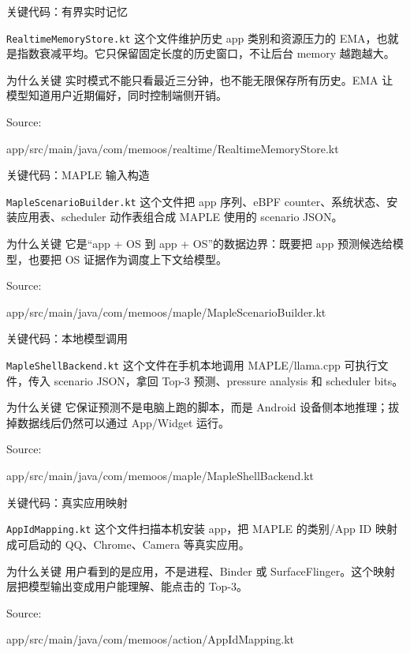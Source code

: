 \documentclass[UTF8,aspectratio=169,10pt]{ctexbeamer}
\newcommand{\code}[1]{\texttt{\small #1}}
\newcommand{\sourcefoot}[1]{%
  \vfill
  {\scriptsize\textcolor{memoGray}{Source: }%
  \parbox[t]{0.84\textwidth}{\raggedright\ttfamily\scriptsize #1}}%
}
\begin{document}
\begin{frame}{关键代码：有界实时记忆}
  \begin{block}{\code{RealtimeMemoryStore.kt}}
    这个文件维护历史 app 类别和资源压力的 EMA，也就是指数衰减平均。它只保留固定长度的历史窗口，不让后台 memory 越跑越大。
  \end{block}
  \begin{block}{为什么关键}
    实时模式不能只看最近三分钟，也不能无限保存所有历史。EMA 让模型知道用户近期偏好，同时控制端侧开销。
  \end{block}
  \sourcefoot{app/src/main/java/com/memoos/realtime/RealtimeMemoryStore.kt}
\end{frame}

\begin{frame}{关键代码：MAPLE 输入构造}
  \begin{block}{\code{MapleScenarioBuilder.kt}}
    这个文件把 app 序列、eBPF counter、系统状态、安装应用表、scheduler 动作表组合成 MAPLE 使用的 scenario JSON。
  \end{block}
  \begin{block}{为什么关键}
    它是“app + OS 到 app + OS”的数据边界：既要把 app 预测候选给模型，也要把 OS 证据作为调度上下文给模型。
  \end{block}
  \sourcefoot{app/src/main/java/com/memoos/maple/MapleScenarioBuilder.kt}
\end{frame}

\begin{frame}{关键代码：本地模型调用}
  \begin{block}{\code{MapleShellBackend.kt}}
    这个文件在手机本地调用 MAPLE/llama.cpp 可执行文件，传入 scenario JSON，拿回 Top-3 预测、pressure analysis 和 scheduler bits。
  \end{block}
  \begin{block}{为什么关键}
    它保证预测不是电脑上跑的脚本，而是 Android 设备侧本地推理；拔掉数据线后仍然可以通过 App/Widget 运行。
  \end{block}
  \sourcefoot{app/src/main/java/com/memoos/maple/MapleShellBackend.kt}
\end{frame}

\begin{frame}{关键代码：真实应用映射}
  \begin{block}{\code{AppIdMapping.kt}}
    这个文件扫描本机安装 app，把 MAPLE 的类别/App ID 映射成可启动的 QQ、Chrome、Camera 等真实应用。
  \end{block}
  \begin{block}{为什么关键}
    用户看到的是应用，不是进程、Binder 或 SurfaceFlinger。这个映射层把模型输出变成用户能理解、能点击的 Top-3。
  \end{block}
  \sourcefoot{app/src/main/java/com/memoos/action/AppIdMapping.kt}
\end{frame}
\end{document}
